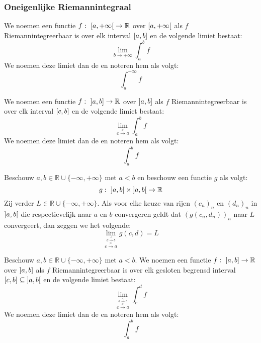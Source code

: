 \documentclass[main.tex]{subfiles}
\begin{document}
\subsubsection{Oneigenlijke Riemannintegraal}
\label{sec:oneig-riem}

\begin{de}
  We noemen een functie $f:\ \interval[open right]{a}{+\infty} \rightarrow \mathbb{R}$   over $\interval[open right]{a}{+\infty}$ als $f$ Riemannintegreerbaar is over elk interval $\interval{a}{b}$ en de volgende limiet bestaat:
  \[ \lim_{b\rightarrow +\infty}\int_{a}^{b}f \]
  We noemen deze limiet dan de  en noteren hem als volgt:
  \[ \int_{a}^{+\infty}f \]
\end{de}

\begin{de}
  We noemen een functie $f:\ \interval[open left]{a}{b} \rightarrow \mathbb{R}$   over $\interval[open left]{a}{b}$ als $f$ Riemannintegreerbaar is over elk interval $\interval{c}{b}$ en de volgende limiet bestaat:
  \[ \lim_{c\overset{>}{\rightarrow} a}\int_{a}^{b}f \]
  We noemen deze limiet dan de  en noteren hem als volgt:
  \[ \int_{a}^{b}f \]
\end{de}

\begin{de}
  Beschouw $a,b \in \mathbb{R} \cup \{ -\infty, +\infty \}$ met $a < b$ en beschouw een functie $g$ als volgt:
  \[ g:\ \interval[open]{a}{b} \times \interval[open]{a}{b} \rightarrow \mathbb{R} \]
  Zij verder $L \in \mathbb{R} \cup \{ -\infty, +\infty \}$.
  Als voor elke keuze van rijen $(c_{n})_{n}$ en $(d_{n})_{n}$ in $\interval[open]{a}{b}$ die respectievelijk naar $a$ en $b$ convergeren geldt dat $(g(c_{n},d_{n}))_{n}$ naar $L$ convergeert, dan zeggen we het volgende:
  \[ \lim_{\overset{d \overset{<}{\rightarrow} b}{c\overset{>}{\rightarrow} a}} g(c,d) = L \]
\end{de}

\begin{de}
  Beschouw $a,b\in \mathbb{R} \cup \{-\infty,+\infty\}$ met $a<b$.
  We noemen een functie $f:\ \interval[open left]{a}{b} \rightarrow \mathbb{R}$   over $\interval[open left]{a}{b}$ als $f$ Riemannintegreerbaar is over elk gesloten begrensd interval $\interval{c}{b} \subseteq \interval[open]{a}{b}$ en de volgende limiet bestaat:
  \[ \lim_{\overset{d \overset{<}{\rightarrow} b}{c\overset{>}{\rightarrow} a}}\int_{c}^{d}f \]
  We noemen deze limiet dan de  en noteren hem als volgt:
  \[ \int_{a}^{b}f \]
\end{de}
\end{document}
